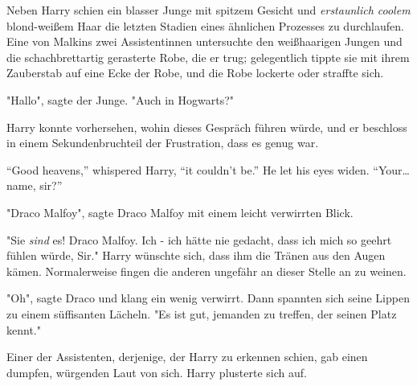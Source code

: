 Neben Harry schien ein blasser Junge mit spitzem Gesicht und \emph{erstaunlich coolem} blond-weißem Haar die letzten Stadien eines ähnlichen Prozesses zu durchlaufen. Eine von Malkins zwei Assistentinnen untersuchte den weißhaarigen Jungen und die schachbrettartig gerasterte Robe, die er trug; gelegentlich tippte sie mit ihrem Zauberstab auf eine Ecke der Robe, und die Robe lockerte oder straffte sich. 

"Hallo", sagte der Junge. "Auch in Hogwarts?"

Harry konnte vorhersehen, wohin dieses Gespräch führen würde, und er beschloss in einem Sekundenbruchteil der Frustration, dass es genug war. 

“Good heavens,” whispered Harry, “it couldn’t be.” He let his eyes widen. “Your…name, sir?”

"Draco Malfoy", sagte Draco Malfoy mit einem leicht verwirrten Blick.

"Sie \emph{sind} es! Draco Malfoy. Ich - ich hätte nie gedacht, dass ich mich so geehrt fühlen würde, Sir." Harry wünschte sich, dass ihm die Tränen aus den Augen kämen. Normalerweise fingen die anderen ungefähr an dieser Stelle an zu weinen. 

"Oh", sagte Draco und klang ein wenig verwirrt. Dann spannten sich seine Lippen zu einem süffisanten Lächeln.
"Es ist gut, jemanden zu treffen, der seinen Platz kennt."

Einer der Assistenten, derjenige, der Harry zu erkennen schien, gab einen dumpfen, würgenden Laut von sich. Harry plusterte sich auf. 


